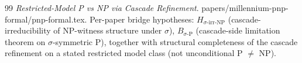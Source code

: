 \documentclass[11pt, a4paper]{amsart}
\theoremstyle{definition}
\begin{document}
\begin{thebibliography}{99}
\emph{Restricted-Model P vs NP via Cascade Refinement}.
papers/millennium-pnp-formal/pnp-formal.tex.  Per-paper bridge
hypotheses: $H_{\sigma\text{-irr-NP}}$ (cascade-irreducibility of
NP-witness structure under $\sigma$), $B_{\sigma\text{-P}}$
(cascade-side limitation theorem on $\sigma$-symmetric P), together
with structural completeness of the cascade refinement on a stated
restricted model class (not unconditional P $\neq$ NP).

\end{thebibliography}
\end{document}
